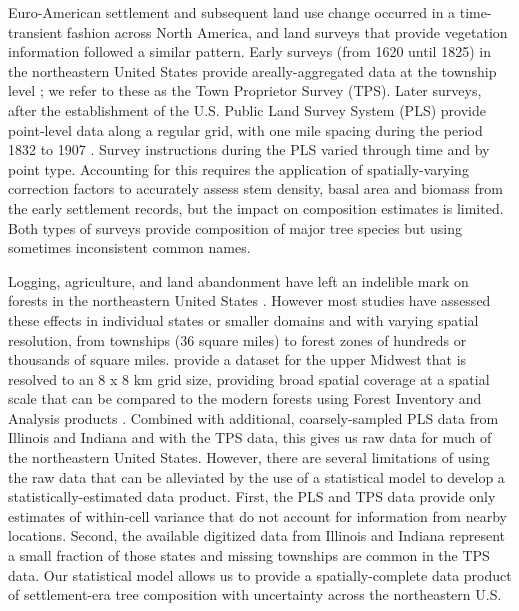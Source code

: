\documentclass[12pt]{article}\usepackage[]{graphicx}\usepackage[]{color}
\begin{document}
Euro-American settlement and subsequent land use change occurred in
a time-transient fashion across North America, and land surveys that
provide vegetation information followed a similar pattern. Early surveys
(from 1620 until 1825) in the northeastern United States provide areally-aggregated
data at the township level \citep{cogbill2002forests,thompson2013four};
we refer to these as the Town Proprietor Survey (TPS). Later surveys,
after the establishment of the U.S. Public Land Survey System (PLS)
provide point-level data along a regular grid, with one mile spacing
during the period 1832 to 1907 \citep{bourdo1956review,schulte2001original,goring2015composition}.
Survey instructions during the PLS varied through time and by point
type. Accounting for this requires the application of spatially-varying
correction factors \citep{cogbill2015corrections,goring2015composition}
to accurately assess stem density, basal area and biomass from the
early settlement records, but the impact on composition estimates
is limited. Both types of surveys provide composition of major tree
species but using sometimes inconsistent common names.

Logging, agriculture, and land abandonment have left an indelible
mark on forests in the northeastern United States \citep{foster1998land,rhemtulla2009legacies,thompson2013four,goring2015composition}.
However most studies have assessed these effects in individual states
or smaller domains \citep{friedman2005regional,rhemtulla2009historical}
and with varying spatial resolution, from townships (36 square miles)
to forest zones of hundreds or thousands of square miles. \citet{goring2015composition}
provide a dataset for the upper Midwest that is resolved to an 8 x
8 km grid size, providing broad spatial coverage at a spatial scale
that can be compared to the modern forests using Forest Inventory
and Analysis products \citep{gray2012forest}. Combined with additional,
coarsely-sampled PLS data from Illinois and Indiana and with the TPS
data, this gives us raw data for much of the northeastern United States.
However, there are several limitations of using the raw data that
can be alleviated by the use of a statistical model to develop a statistically-estimated
data product. First, the PLS and TPS data provide only estimates of
within-cell variance that do not account for information from nearby
locations. Second, the available digitized data from Illinois and
Indiana represent a small fraction of those states and missing townships
are common in the TPS data. Our statistical model allows us to provide
a spatially-complete data product of settlement-era tree composition
with uncertainty across the northeastern U.S.
\end{document}
